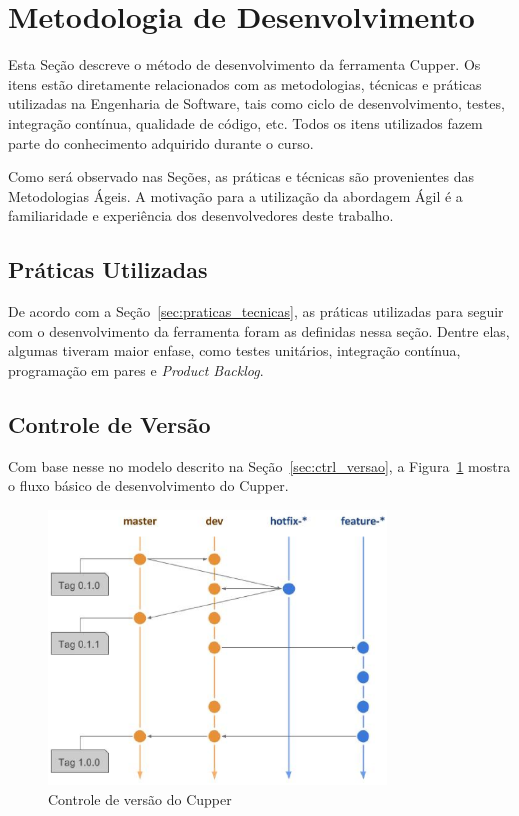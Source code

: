 \section{Metodologia de Desenvolvimento}
\label{sec:desenvolvimento}

Esta Seção descreve o método de desenvolvimento da ferramenta Cupper.
Os itens estão diretamente relacionados com as metodologias, técnicas e
práticas utilizadas na Engenharia de Software, tais como ciclo de
desenvolvimento, testes, integração contínua, qualidade de código, etc.
Todos os itens utilizados fazem parte do conhecimento adquirido durante
o curso.

Como será observado nas Seções, as práticas e técnicas são provenientes
das Metodologias Ágeis. A motivação para a utilização da abordagem
Ágil é a familiaridade e experiência dos desenvolvedores deste trabalho.


\subsection{Práticas Utilizadas}
\label{sec:prat_ut}

De acordo com a Seção~\ref{sec:praticas_tecnicas}, as práticas utilizadas
para seguir com o desenvolvimento da ferramenta foram as definidas nessa seção.
Dentre elas, algumas tiveram maior enfase, como testes unitários, integração contínua,
programação em pares e \textit{Product Backlog}.

\subsection{Controle de Versão}
\label{sec:ctrl_versao_met}

Com base nesse no modelo descrito na Seção~\ref{sec:ctrl_versao}, a Figura~\ref{fig:ctrl_versao}
mostra o fluxo básico de desenvolvimento do Cupper.

\begin{figure}[]
  \centering
  \includegraphics[width=0.8\textwidth]{figuras/controle_versao}
  \caption{Controle de versão do Cupper}
  \label{fig:ctrl_versao}
\end{figure}

